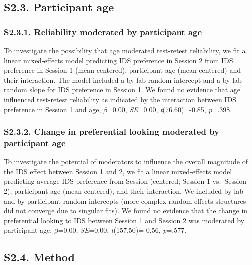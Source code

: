 \documentclass[
  man, donotrepeattitle,floatsintext]{apa6}
\begin{document}
\hypertarget{s2.3.-participant-age}{%
\subsection{S2.3. Participant age}\label{s2.3.-participant-age}}

\hypertarget{s2.3.1.-reliability-moderated-by-participant-age}{%
\subsubsection{S2.3.1. Reliability moderated by participant age}\label{s2.3.1.-reliability-moderated-by-participant-age}}

To investigate the possibility that age moderated test-retest reliability, we fit a linear mixed-effects model predicting IDS preference in Session 2 from IDS preference in Session 1 (mean-centered), participant age (mean-centered) and their interaction.
The model included a by-lab random intercept and a by-lab random slope for IDS preference in Session 1.
We found no evidence that age influenced test-retest reliability as indicated by the interaction between IDS preference in Session 1 and age, \(\beta\)=0.00, \emph{SE}=0.00, \emph{t}(76.60)=-0.85, \emph{p}=.398.

\hypertarget{s2.3.2.-change-in-preferential-looking-moderated-by-participant-age}{%
\subsubsection{S2.3.2. Change in preferential looking moderated by participant age}\label{s2.3.2.-change-in-preferential-looking-moderated-by-participant-age}}

To investigate the potential of moderators to influence the overall magnitude of the IDS effect between Session 1 and 2, we fit a linear mixed-effects model predicting average IDS preference from Session (centered; Session 1 vs.~Session 2), participant age (mean-centered), and their interaction.
We included by-lab and by-participant random intercepts (more complex random effects structures did not converge due to singular fits).
We found no evidence that the change in preferential looking to IDS between Session 1 and Session 2 was moderated by participant age, \(\beta\)=0.00, \emph{SE}=0.00, \emph{t}(157.50)=-0.56, \emph{p}=.577.

\hypertarget{s2.4.-method}{%
\subsection{S2.4. Method}\label{s2.4.-method}}
\end{document}
